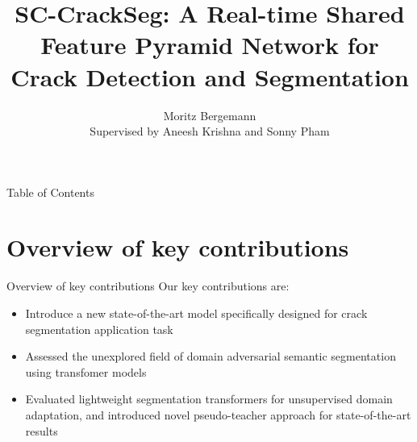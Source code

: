 \documentclass{lib/curtin_format}
\title[SC-CrackSeg]{\huge\textbf{SC-CrackSeg: A Real-time Shared Feature Pyramid
Network for Crack Detection and Segmentation}}
\author{Moritz Bergemann \\ Supervised by Aneesh Krishna and Sonny Pham}
\institute[Curtin]{
    \normalsize{\email{}}
    \newline
    \department{School of EECMS}
    \curtin
}
\date{}
\begin{document}


\begin{frame}{}

    \maketitle
    \vspace{-0.4cm}
    \begin{figure}
        \centering
        \label{fig:logo}
    \end{figure}

\end{frame}

\begin{frame}{Table of Contents}
    \tableofcontents
\end{frame}

\section{Overview of key contributions}
\begin{frame}{Overview of key contributions}
    Our key contributions are:
    \begin{itemize}
        \item Introduce a new state-of-the-art model specifically designed for crack segmentation application task
        \item Assessed the unexplored field of domain adversarial semantic segmentation using transfomer models
        \item Evaluated lightweight segmentation transformers for unsupervised domain adaptation, and introduced novel pseudo-teacher approach for state-of-the-art results
    \end{itemize}
\end{frame}
\end{document}
